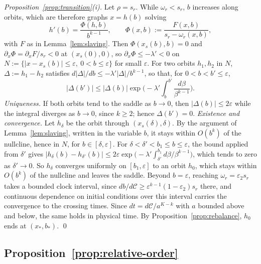 \documentclass[11pt]{article}
\newcommand{\Clk}{\mathcal{C}}
\theoremstyle{definition}
\numberwithin{equation}{section}
\begin{document}
\emph{Proposition~\ref{prop:transition}(i).} Let $\rho=s_r$. While $\omega_r<s_r$, $b$ increases along orbits, which are therefore graphs $x=h(b)$ solving
\[
h'(b)=\frac{\Phi(h,b)}{b^{k-1}},\qquad\Phi(x,b):=\frac{F(x,b)}{s_r-\omega_r(x,b)},
\]
with $F$ as in Lemma~\ref{lem:slaving}. Then $\Phi(x_s(b),b)=0$ and $\partial_x\Phi=\partial_xF/s_r<0$ at $(x_s(0),0)$, so $\partial_x\Phi\le-\lambda'<0$ on $N:=\{|x-x_s(b)|\le\varepsilon,\ 0<b\le\varepsilon\}$ for small $\varepsilon$. For two orbits $h_1,h_2$ in $N$, $\Delta:=h_1-h_2$ satisfies $d|\Delta|/db\le-\lambda'|\Delta|/b^{k-1}$, so that, for $0<b<b'\le\varepsilon$,
\[
|\Delta(b')|\le|\Delta(b)|\exp\Big(-\lambda'\int_b^{b'}\frac{d\beta}{\beta^{k-1}}\Big).
\]
\emph{Uniqueness.} If both orbits tend to the saddle as $b\to0$, then $|\Delta(b)|\le2\varepsilon$ while the integral diverges as $b\to0$, since $k\ge2$; hence $\Delta(b')=0$. \emph{Existence and convergence.} Let $h_\delta$ be the orbit through $(x_s(\delta),\delta)$. By the argument of Lemma~\ref{lem:slaving}, written in the variable $b$, it stays within $O(b^k)$ of the nullcline, hence in $N$, for $b\in[\delta,\varepsilon]$. For $\delta<\delta'<b_1\le b\le\varepsilon$, the bound applied from $\delta'$ gives $|h_\delta(b)-h_{\delta'}(b)|\le2\varepsilon\exp\big(-\lambda'\int_{\delta'}^{b_1}d\beta/\beta^{k-1}\big)$, which tends to zero as $\delta'\to0$. So $h_\delta$ converges uniformly on $[b_1,\varepsilon]$ to an orbit $h_0$, which stays within $O(b^k)$ of the nullcline and leaves the saddle. Beyond $b=\varepsilon$, reaching $\omega_r=\varepsilon_2s_r$ takes a bounded clock interval, since $db/d\Clk\ge\varepsilon^{k-1}(1-\varepsilon_2)s_r$ there, and continuous dependence on initial conditions over this interval carries the convergence to the crossing times. Since $dt=d\Clk/a^{K-k}$ with $a$ bounded above and below, the same holds in physical time. By Proposition~\ref{prop:rebalance}, $h_0$ ends at $(x_*,b_*)$. \qed

\subsection{Proposition~\ref{prop:relative-order}}\label{app:relative-order}
\end{document}
